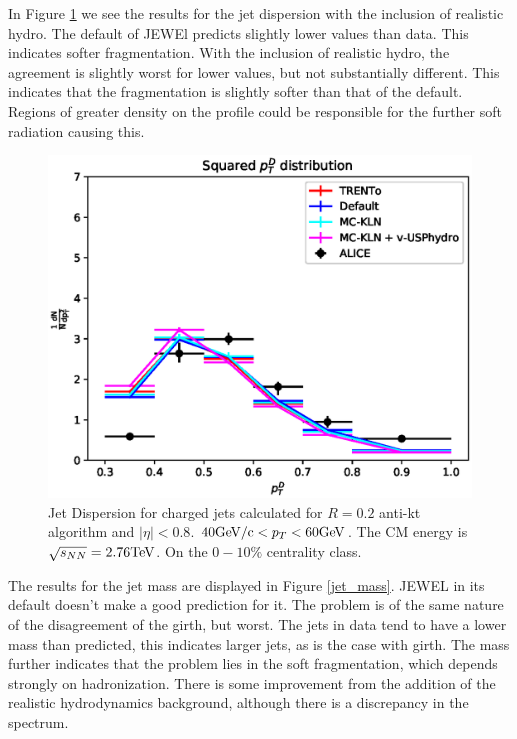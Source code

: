 In Figure \ref{jet_dispersion} we see the results for the jet dispersion with the inclusion of realistic hydro. The default of JEWEl predicts slightly lower values than data. This indicates softer fragmentation. With the inclusion of realistic hydro, the agreement is slightly worst for lower values, but not substantially different. This indicates that the fragmentation is slightly softer than that of the default. Regions of greater density on the profile could be responsible for the further soft radiation causing this.

\begin{figure}
\includegraphics[width=1.0\textwidth]{images/Squared_4.eps}
\caption[Jet $p_D^T$]{Jet Dispersion for charged jets calculated for $R=0.2$ anti-kt algorithm and $|\eta|<0.8$. $40 {\rm GeV/c} < p_T < 60 {\rm GeV}$. The CM energy is $\sqrt{s_{NN}}= 2.76 {\rm TeV}$. On the $0-10\%$ centrality class.}
\label{jet_dispersion}
\end{figure}

The results for the jet mass are displayed in Figure \ref{jet_mass}. JEWEL in its default doesn't make a good prediction for it. The problem is of the same nature of the disagreement of the girth, but worst. The jets in data tend to have a lower mass than predicted, this indicates larger jets, as is the case with girth. The mass further indicates that the problem lies in the soft fragmentation, which depends strongly on hadronization. There is some improvement from the addition of the realistic hydrodynamics background, although there is a discrepancy in the spectrum. 

